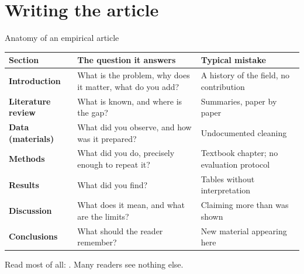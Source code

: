 \documentclass[aspectratio=169,11pt,t]{beamer}
\begin{document}
\section{Writing the article}

\begin{frame}{Anatomy of an empirical article}
  \footnotesize
  \begin{tabular}{@{}>{\raggedright\bfseries}p{}>{\raggedright}p{}>{\raggedright\arraybackslash}p{}@{}}
    \toprule
    Section & The question it answers & Typical mistake \\
    \midrule
    Introduction & What is the problem, why does it matter, what do you add? & A history of the field, no contribution \\
    Literature review & What is known, and where is the gap? & Summaries, paper by paper \\
    Data (materials) & What did you observe, and how was it prepared? & Undocumented cleaning \\
    Methods & What did you do, precisely enough to repeat it? & Textbook chapter; no evaluation protocol \\
    Results & What did you find? & Tables without interpretation \\
    Discussion & What does it mean, and what are the limits? & Claiming more than was shown \\
    Conclusions & What should the reader remember? & New material appearing here \\
    \bottomrule
  \end{tabular}

  \smallskip
  \small
  Read most of all: . Many readers see nothing else.
\end{frame}
\end{document}
